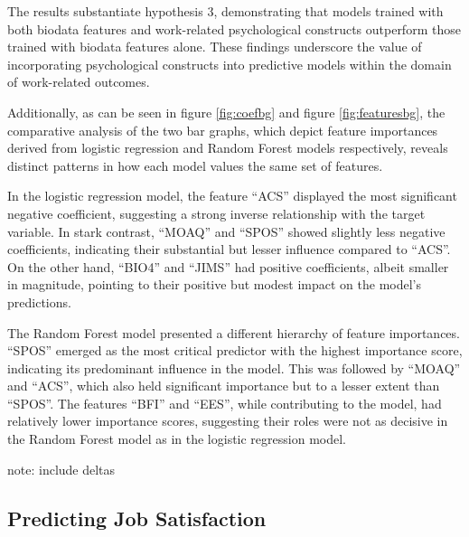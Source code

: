 \documentclass[
  man]{apa7}
\begin{document}
The results substantiate hypothesis 3, demonstrating that models trained with both biodata features and work-related psychological constructs outperform those trained with biodata features alone. These findings underscore the value of incorporating psychological constructs into predictive models within the domain of work-related outcomes.

Additionally, as can be seen in figure \ref{fig:coefbg} and figure \ref{fig:featuresbg}, the comparative analysis of the two bar graphs, which depict feature importances derived from logistic regression and Random Forest models respectively, reveals distinct patterns in how each model values the same set of features.

In the logistic regression model, the feature ``ACS'' displayed the most significant negative coefficient, suggesting a strong inverse relationship with the target variable. In stark contrast, ``MOAQ'' and ``SPOS'' showed slightly less negative coefficients, indicating their substantial but lesser influence compared to ``ACS''. On the other hand, ``BIO4'' and ``JIMS'' had positive coefficients, albeit smaller in magnitude, pointing to their positive but modest impact on the model's predictions.

The Random Forest model presented a different hierarchy of feature importances. ``SPOS'' emerged as the most critical predictor with the highest importance score, indicating its predominant influence in the model. This was followed by ``MOAQ'' and ``ACS'', which also held significant importance but to a lesser extent than ``SPOS''. The features ``BFI'' and ``EES'', while contributing to the model, had relatively lower importance scores, suggesting their roles were not as decisive in the Random Forest model as in the logistic regression model.

note: include deltas

\hypertarget{predicting-job-satisfaction}{%
\subsection{Predicting Job Satisfaction}\label{predicting-job-satisfaction}}
\end{document}
